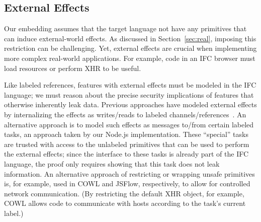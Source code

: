 \subsection{External Effects}
\label{sec:extensions:external}
Our embedding assumes that the target language not have any
primitives that can induce external-world effects.
%
As discussed in Section~\ref{sec:real}, imposing this restriction
can be challenging.
%
Yet, external effects are crucial when implementing more complex
real-world applications.
%
For example, code in an IFC browser must load resources or
perform XHR to be useful.

Like labeled references, features with external effects must be
modeled in the IFC language; we must reason about the precise security
implications of features that otherwise inherently leak data.
%
Previous approaches have modeled external effects by internalizing the
effects as writes/reads to labeled channels/references~\cite{stefan:addressing-covert}.
%
An alternative approach is to model such effects as messages to/from
certain labeled tasks, an approach taken by our Node.js
implementation.
%
These ``special'' tasks are trusted with access to the unlabeled
primitives that can be used to perform the external effects; since the
interface to these tasks is already part of the IFC language, the
proof only requires showing that this task does not leak information.
%
An alternative approach of restricting or wrapping unsafe primitives
is, for example, used in COWL and JSFlow, respectively, to allow for
controlled network communication.
%
(By restricting the default XHR object, for example, COWL allows code
to communicate with hosts according to the task's current label.)
